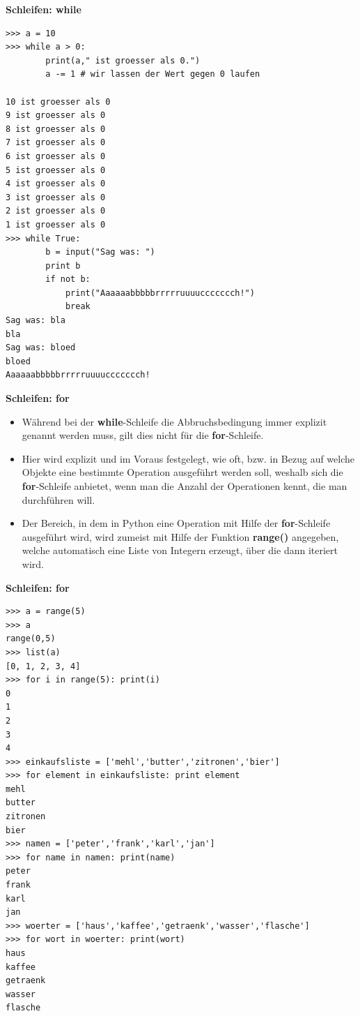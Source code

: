 \vspace{0.5cm}\par\noindent\textbf{Schleifen: while}\vspace{0.5cm}

\begin{verbatim}
>>> a = 10
>>> while a > 0: 
        print(a," ist groesser als 0.")
        a -= 1 # wir lassen der Wert gegen 0 laufen

10 ist groesser als 0
9 ist groesser als 0
8 ist groesser als 0
7 ist groesser als 0
6 ist groesser als 0
5 ist groesser als 0
4 ist groesser als 0
3 ist groesser als 0
2 ist groesser als 0
1 ist groesser als 0
>>> while True:
        b = input("Sag was: ")
        print b
        if not b:
            print("Aaaaaabbbbbrrrrruuuuccccccch!")
            break
Sag was: bla
bla
Sag was: bloed
bloed
Aaaaaabbbbbrrrrruuuuccccccch!
\end{verbatim}




\vspace{0.5cm}\par\noindent\textbf{Schleifen: for}\vspace{0.5cm}

\begin{itemize}
\itemsep1pt\parskip0pt
\item
  {Während bei der \textbf{while}-Schleife die Abbruchsbedingung immer
  explizit genannt werden muss, gilt dies nicht für die
  \textbf{for}-Schleife.}
\item
  {Hier wird explizit und im Voraus festgelegt, wie oft, bzw. in Bezug
  auf welche Objekte eine bestimmte Operation ausgeführt werden soll,
  weshalb sich die \textbf{for}-Schleife anbietet, wenn man die Anzahl
  der Operationen kennt, die man durchführen will.}
\item
  {Der Bereich, in dem in Python eine Operation mit Hilfe der
  \textbf{for}-Schleife ausgeführt wird, wird zumeist mit Hilfe der
  Funktion \textbf{range()} angegeben, welche automatisch eine Liste von
  Integern erzeugt, über die dann iteriert wird.}
\end{itemize}




\vspace{0.5cm}\par\noindent\textbf{Schleifen: for}\vspace{0.5cm}

\begin{verbatim}
>>> a = range(5)
>>> a
range(0,5)
>>> list(a)
[0, 1, 2, 3, 4]
>>> for i in range(5): print(i)
0
1
2
3
4
>>> einkaufsliste = ['mehl','butter','zitronen','bier']
>>> for element in einkaufsliste: print element
mehl
butter
zitronen
bier
>>> namen = ['peter','frank','karl','jan']
>>> for name in namen: print(name)
peter
frank
karl
jan
>>> woerter = ['haus','kaffee','getraenk','wasser','flasche']
>>> for wort in woerter: print(wort)
haus
kaffee
getraenk
wasser
flasche
\end{verbatim}


